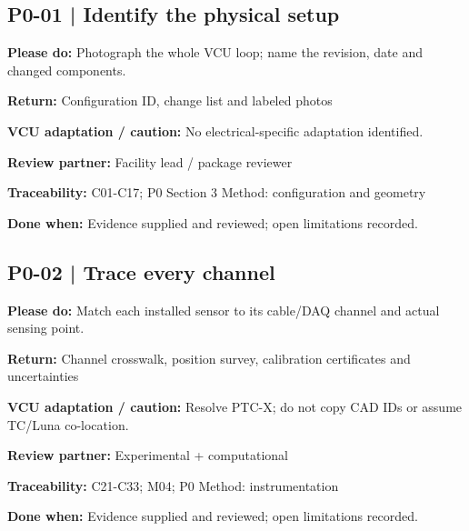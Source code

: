 \documentclass[11pt]{article}
\begin{document}
\begin{minipage}{\textwidth}\small\setlength{\parskip}{2pt}
\subsection*{P0-01 | Identify the physical setup}
\textbf{Please do:} Photograph the whole VCU loop; name the revision, date and changed components.\par
\textbf{Return:} Configuration ID, change list and labeled photos\par
\textbf{VCU adaptation / caution:} No electrical-specific adaptation identified.\par
\textbf{Review partner:} Facility lead / package reviewer\par
\textbf{Traceability:} C01-C17; P0 Section 3 Method: configuration and geometry\par
\textbf{Done when:} Evidence supplied and reviewed; open limitations recorded.\par
\end{minipage}\par\vspace{8pt}
\begin{minipage}{\textwidth}\small\setlength{\parskip}{2pt}
\subsection*{P0-02 | Trace every channel}
\textbf{Please do:} Match each installed sensor to its cable/DAQ channel and actual sensing point.\par
\textbf{Return:} Channel crosswalk, position survey, calibration certificates and uncertainties\par
\textbf{VCU adaptation / caution:} Resolve PTC-X; do not copy CAD IDs or assume TC/Luna co-location.\par
\textbf{Review partner:} Experimental + computational\par
\textbf{Traceability:} C21-C33; M04; P0 Method: instrumentation\par
\textbf{Done when:} Evidence supplied and reviewed; open limitations recorded.\par
\end{minipage}\par\vspace{8pt}
\end{document}
